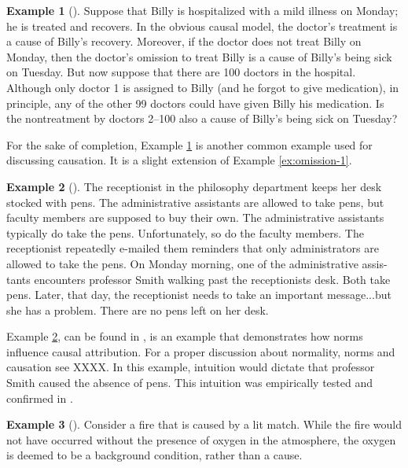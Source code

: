 \documentclass[11pt,a4paper]{book}
\theoremstyle{definition}
\theoremstyle{definition}
\newtheorem{example}{Example}[section]
\theoremstyle{definition}
\theoremstyle{remark}
\begin{document}
\begin{example}[\cite{halpern2011actual}]
\label{ex:omission-2}
Suppose that Billy is hospitalized with a mild illness on Monday; he is treated and recovers. In the obvious causal model, the doctor’s treatment is a cause of Billy’s recovery. Moreover, if the doctor does not treat Billy on Monday, then the doctor’s omission to treat Billy is a cause of Billy’s being sick on Tuesday. But now suppose that there are 100 doctors in the hospital. Although only doctor 1 is assigned to Billy (and he forgot to give medication), in principle, any of the other 99 doctors could have given Billy his medication. Is the nontreatment by doctors 2–100 also a cause of Billy’s being sick on Tuesday?
\end{example}

For the sake of completion, Example \ref{ex:omission-2} is another common example used for discussing causation. It is a slight extension of Example \ref{ex:omission-1}.



\begin{example}[\cite{halpern2015graded}]
\label{ex:norms-1}
 The receptionist in the philosophy department keeps her desk stocked with pens. The administrative assistants are allowed to take pens, but faculty members are supposed to buy their own. The administrative assistants typically do take the pens. Unfortunately, so do the faculty members. The receptionist repeatedly e-mailed them reminders that only administrators are allowed to take the pens. On Monday morning, one of the administrative assis- tants encounters professor Smith walking past the receptionists desk. Both take pens. Later, that day, the receptionist needs to take an important message...but she has a problem. There are no pens left on her desk.
 \end{example}
 
Example \ref{ex:norms-1}, can be found in \parencite{beckers2016general,halpern2015graded}, is an example that demonstrates how norms influence causal attribution.
For a proper discussion about normality, norms and causation see XXXX.
In this example, intuition would dictate that professor Smith caused the absence of pens. This intuition was empirically tested and confirmed in \parencite{knobe2008causal}.

\begin{example}[\cite{halpern2015graded}]
\label{ex:background-1}
Consider a fire that is caused by a lit match. While the fire would not have occurred without the presence of oxygen in the atmosphere, the oxygen is deemed to be a background condition, rather than a cause.
 \end{example}
\end{document}
